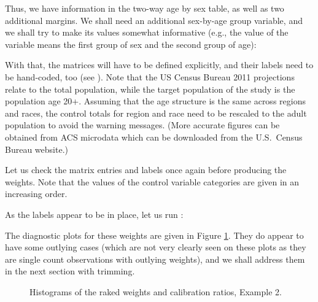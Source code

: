 \begin{stexample}[Example 2]
Thus, we have information in the two-way age by sex table, as well
as two additional margins. We shall need an additional sex-by-age group variable,
and we shall try to make its values somewhat informative
(e.g., the value  of the variable  means
the first group of sex and the second group of age):

\begin{stlog}
\nullskip
\end{stlog}

With that, the matrices will have to be defined explicitly,
and their labels need to be hand-coded, too (see ).
Note that the US Census Bureau 2011
projections relate to the total population, while the target population
of the study is the population age 20+. Assuming that the age structure
is the same across regions and races, the control totals for region and race
need to be rescaled to the adult population to avoid the warning messages.
(More accurate figures can be obtained from ACS microdata which can be downloaded
from the U.S.\ Census Bureau website.)

\begin{stlog}
\nullskip
\end{stlog}

Let us check the matrix entries and labels once again before
producing the weights.
Note that the values of the control variable categories are given in an increasing order.

\begin{stlog}
\nullskip
\end{stlog}

As the labels appear to be in place, let us run :

\begin{stlog}
\nullskip
\end{stlog}

The diagnostic plots for these weights are given in Figure \ref{fig:example2}.
They do appear to have some outlying cases (which are not very clearly seen
on these plots as they are single count observations with outlying weights),
and we shall address them in the next section with trimming.

\begin{figure}[h!]
\begin{center}
\end{center}
\caption{Histograms of the raked weights and calibration ratios, Example 2.}
\label{fig:example2}
\end{figure}

\end{stexample}


